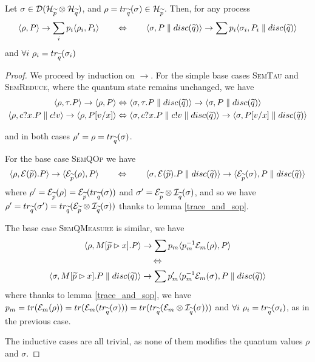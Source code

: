 \begin{lemma}\label{lemma_transition_partial_trace}
Let $\sigma \in  \mathcal{D}(\mathcal{H}_{\widetilde{p}} \otimes \mathcal{H}_{\widetilde{q}})$, and $\rho = tr_{\widetilde{q}}(\sigma) \in \mathcal{H}_{\widetilde{p}}$. Then, for any process 
\[ \langle\rho, P\rangle \rightarrow \sum_i p_i \langle\rho_i, P_i\rangle 
\qquad\Leftrightarrow\qquad
\langle\sigma, P\parallel disc(\widetilde{q})\rangle \rightarrow \sum p_i \langle\sigma_i, P_i\parallel disc(\widetilde{q})\rangle
\]
and $\forall i \ \rho_i = \trQ(\sigma_i)$
\end{lemma}
\begin{proof}
We proceed by induction on $\rightarrow$. For the simple base cases {\footnotesize\scshape SemTau} and {\footnotesize\scshape SemReduce}, where the quantum state remains unchanged, we have 
\begin{align*}
\langle\rho, \tau.P\rangle \rightarrow \langle\rho, P\rangle
&\Leftrightarrow
\langle\sigma, \tau.P\parallel disc(\widetilde{q})\rangle \rightarrow \langle\sigma, P\parallel disc(\widetilde{q})\rangle
\\
 \langle\rho, c?x.P\parallel c!v\rangle \rightarrow \langle\rho, P[v / x]\rangle
&\Leftrightarrow
\langle\sigma, c?x.P\parallel c!v \parallel disc(\widetilde{q})\rangle \rightarrow \langle\sigma, P[v / x]\parallel disc(\widetilde{q})\rangle
\end{align*}

and in both cases $\rho' = \rho = tr_{\widetilde{q}}(\sigma)$.

For the base case {\footnotesize\scshape SemQOp} we have 
\[\langle\rho, \mathcal{E}(\widetilde{p}).P\rangle \rightarrow \langle\mathcal{E}_{\widetilde{p}}(\rho), P\rangle
\qquad\Leftrightarrow\qquad
\langle\sigma, \mathcal{E}(\widetilde{p}).P\parallel disc(\widetilde{q})\rangle \rightarrow \langle\mathcal{E}_{\widetilde{p}}(\sigma), P\parallel disc(\widetilde{q})\rangle\]
where $\rho' = \mathcal{E}_{\widetilde{p}}(\rho) = \mathcal{E}_{\widetilde{p}}(tr_{\widetilde{q}}(\sigma))$ and $\sigma' = \mathcal{E}_{\widetilde{p}}\otimes \mathcal{I}_{\widetilde{q}}(\sigma)$, and so we have $\rho' = tr_{\widetilde{q}}(\sigma') = tr_{\widetilde{q}}(\mathcal{E}_{\widetilde{p}}\otimes \mathcal{I}_{\widetilde{q}}(\sigma))$ thanks to lemma \ref{trace_and_sop}.


The base case {\footnotesize\scshape SemQMeasure} is similar, we have 
\begin{gather*}
\langle\rho, M[\widetilde{p} \rhd x].P\rangle \rightarrow \sum p_m\langle p_m^{-1}\mathcal{E}_m(\rho), P\rangle \\
\Leftrightarrow \\
\langle\sigma, M[\widetilde{p} \rhd x].P\parallel disc(\widetilde{q})\rangle \rightarrow \sum p'_m \langle p_m^{-1}\mathcal{E}_m(\sigma), P\parallel disc(\widetilde{q})\rangle
\end{gather*}
where thanks to lemma \ref{trace_and_sop}, we have $p_m = tr(\mathcal{E}_m(\rho)) = tr(\mathcal{E}_m(tr_{\widetilde{q}}(\sigma))) = tr(tr_{\widetilde{q}}(\mathcal{E}_m \otimes \mathcal{I}_{\widetilde{q}}(\sigma)))$ and $\forall i \ \rho_i = \trQ(\sigma_i)$, as in the previous case.

The inductive cases are all trivial, as none of them modifies the quantum values $\rho$ and $\sigma$.
\end{proof}

